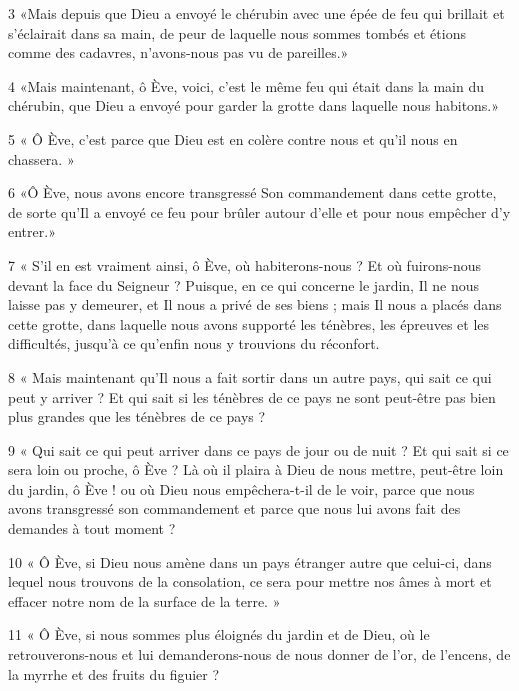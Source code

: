 \par 3 «Mais depuis que Dieu a envoyé le chérubin avec une épée de feu qui brillait et s'éclairait dans sa main, de peur de laquelle nous sommes tombés et étions comme des cadavres, n'avons-nous pas vu de pareilles.»

\par 4 «Mais maintenant, ô Ève, voici, c'est le même feu qui était dans la main du chérubin, que Dieu a envoyé pour garder la grotte dans laquelle nous habitons.»

\par 5 « Ô Ève, c'est parce que Dieu est en colère contre nous et qu'il nous en chassera. »

\par 6 «Ô Ève, nous avons encore transgressé Son commandement dans cette grotte, de sorte qu'Il a envoyé ce feu pour brûler autour d'elle et pour nous empêcher d'y entrer.»

\par 7 « S'il en est vraiment ainsi, ô Ève, où habiterons-nous ? Et où fuirons-nous devant la face du Seigneur ? Puisque, en ce qui concerne le jardin, Il ne nous laisse pas y demeurer, et Il nous a privé de ses biens ; mais Il nous a placés dans cette grotte, dans laquelle nous avons supporté les ténèbres, les épreuves et les difficultés, jusqu'à ce qu'enfin nous y trouvions du réconfort.

\par 8 « Mais maintenant qu'Il nous a fait sortir dans un autre pays, qui sait ce qui peut y arriver ? Et qui sait si les ténèbres de ce pays ne sont peut-être pas bien plus grandes que les ténèbres de ce pays ?

\par 9 « Qui sait ce qui peut arriver dans ce pays de jour ou de nuit ? Et qui sait si ce sera loin ou proche, ô Ève ? Là où il plaira à Dieu de nous mettre, peut-être loin du jardin, ô Ève ! ou où Dieu nous empêchera-t-il de le voir, parce que nous avons transgressé son commandement et parce que nous lui avons fait des demandes à tout moment ?

\par 10 « Ô Ève, si Dieu nous amène dans un pays étranger autre que celui-ci, dans lequel nous trouvons de la consolation, ce sera pour mettre nos âmes à mort et effacer notre nom de la surface de la terre. »

\par 11 « Ô Ève, si nous sommes plus éloignés du jardin et de Dieu, où le retrouverons-nous et lui demanderons-nous de nous donner de l'or, de l'encens, de la myrrhe et des fruits du figuier ?

